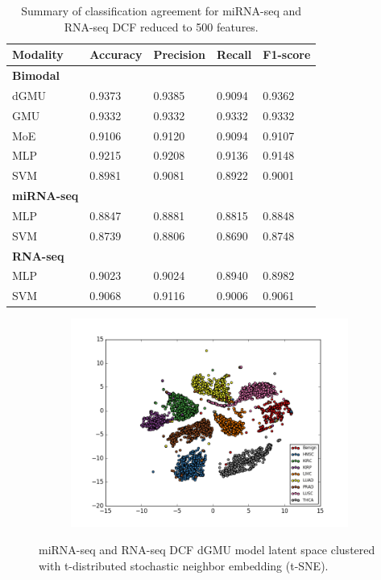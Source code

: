 \begin{table}[H]
   \caption{Summary of classification agreement for miRNA-seq and RNA-seq DCF reduced to 500 features.} 
   \small %
   \centering %
   \begin{tabular}{lllll} %
   \toprule[\heavyrulewidth]\toprule[\heavyrulewidth]
   \textbf{Modality} & \textbf{Accuracy} & \textbf{Precision} & \textbf{Recall} & \textbf{F1-score} \\ 
   \midrule
   \multicolumn{1}{l}{\textbf{Bimodal}} \\
        dGMU & 0.9373 &	0.9385 & 0.9094 & 0.9362\\
        GMU  & 0.9332 &	0.9332 & 0.9332 & 0.9332\\
        MoE  & 0.9106 &	0.9120 & 0.9094 & 0.9107\\
        MLP  & 0.9215 &	0.9208 & 0.9136 & 0.9148\\
        SVM  & 0.8981 &	0.9081 & 0.8922 & 0.9001\\
   \midrule
   \multicolumn{1}{l}{\textbf{miRNA-seq}} \\
        MLP  & 0.8847 &	0.8881 & 0.8815 & 0.8848\\
        SVM  & 0.8739 &	0.8806 & 0.8690 & 0.8748\\
   \midrule
   \multicolumn{1}{l}{\textbf{RNA-seq}}  \\
        MLP  & 0.9023 &	0.9024 & 0.8940 & 0.8982\\
        SVM  & 0.9068 &	0.9116 & 0.9006 & 0.9061\\
   \bottomrule[\heavyrulewidth] 
   \end{tabular}
   \label{table:m_r_dcf_exp41}
\end{table}

\begin{figure}[H]
     \centering
     \begin{subfigure}[b]{\textwidth}
         \centering
         \includegraphics[width=\textwidth]{img/m_r/m_r_dcf_tsne.png}
     \end{subfigure}
        \caption{miRNA-seq and RNA-seq DCF dGMU model latent space clustered with t-distributed stochastic neighbor embedding (t-SNE).}
        \label{fig:r_m_dcf_tsne}
\end{figure}